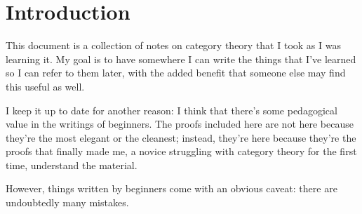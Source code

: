 \documentclass[notes.tex]{subfiles}
\begin{document}
\chapter{Introduction}
\label{ch:introduction}

This document is a collection of notes on category theory that I took as I was learning it. My goal is to have somewhere I can write the things that I've learned so I can refer to them later, with the added benefit that someone else may find this useful as well.

I keep it up to date for another reason: I think that there's some pedagogical value in the writings of beginners. The proofs included here are not here because they're the most elegant or the cleanest; instead, they're here because they're the proofs that finally made me, a novice struggling with category theory for the first time, understand the material.

However, things written by beginners come with an obvious caveat: there are undoubtedly many mistakes.
\end{document}
